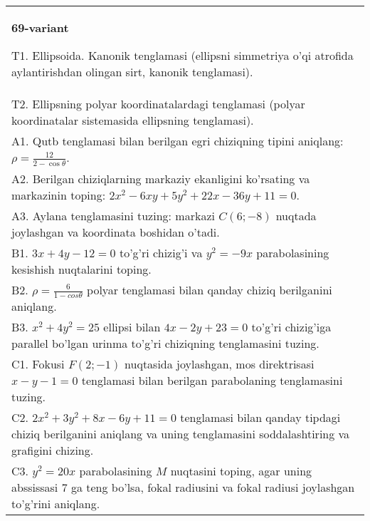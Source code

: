 \documentclass{article}
\begin{document}
\begin{tabular}{m{17cm}}
\textbf{69-variant}
\newline

T1. Ellipsoida. Kanonik tenglamasi (ellipsni simmetriya o'qi atrofida aylantirishdan olingan sirt, kanonik tenglamasi).\\

T2. Ellipsning polyar koordinatalardagi tenglamasi (polyar koordinatalar sistemasida ellipsning tenglamasi).\\

A1. Qutb tenglamasi bilan berilgan egri chiziqning tipini aniqlang: $\rho=\frac{12}{2-\cos\theta}$.\\

A2. Berilgan chiziqlarning markaziy ekanligini ko'rsating va markazinin toping: $2x^{2}-6xy+5y^{2}+22x-36y+11=0$.\\

A3. Aylana tenglamasini tuzing: markazi $C(6;-8)$ nuqtada joylashgan va koordinata boshidan o'tadi.\\

B1. $3x + 4y - 12 = 0$ to'g'ri chizig'i va $y^{2} = - 9x$ parabolasining kesishish nuqtalarini toping.\\

B2. $\rho = \frac{6}{1 - cos\theta}$ polyar tenglamasi bilan qanday chiziq berilganini aniqlang.  \\

B3. $x^{2} + 4y^{2} = 25$ ellipsi bilan $4x - 2y + 23 = 0$ to'g'ri chizig'iga parallel bo'lgan urinma to'g'ri chiziqning tenglamasini tuzing.  \\

C1. Fokusi $F(2; - 1)$ nuqtasida joylashgan, mos direktrisasi $x - y - 1 = 0$ tenglamasi bilan berilgan parabolaning tenglamasini tuzing.  \\

C2. $2x^{2} + 3y^{2} + 8x - 6y + 11 = 0$ tenglamasi bilan qanday tipdagi chiziq berilganini aniqlang va uning tenglamasini soddalashtiring va grafigini chizing.  \\

C3. $y^{2} = 20x$ parabolasining $M$ nuqtasini toping, agar uning abssissasi 7 ga teng bo'lsa, fokal radiusini va fokal radiusi joylashgan to'g'rini aniqlang.\\

\end{tabular}
\vspace{1cm}
\end{document}
